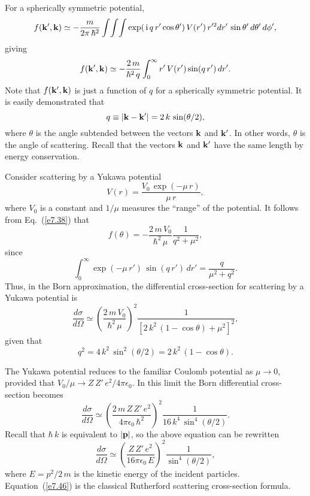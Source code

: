 For a spherically symmetric potential, 
\begin{equation}
f({\bf k}', {\bf k}) \simeq  - \frac{m}{2\pi\, \hbar^2} \int\!\int\!\int
\exp(\,{\rm i} \, q \,r'\cos\theta') \, V(r')\,r'^2 dr'\,\sin\theta'
 \,d\theta'\,d\phi',
\end{equation}
giving
\begin{equation}\label{e7.38}
f({\bf k}', {\bf k}) \simeq  - \frac{2\,m}{\hbar^2\,q}
\int_0^\infty r' \,V(r') \sin(q \,r') \,dr'.
\end{equation}
Note that $f({\bf k}', {\bf k})$ is just a function of $q$ for a
spherically symmetric potential.
It is easily demonstrated that
\begin{equation}
q \equiv |{\bf k} - {\bf k}'| = 2\, k \,\sin (\theta/2),
\end{equation}
where $\theta$ is the angle subtended between the vectors
${\bf k}$ and ${\bf k}'$. In other words, $\theta$ is the angle of
scattering. Recall that the
vectors ${\bf k}$ and ${\bf k}'$ have the same length by energy conservation.

Consider scattering by a Yukawa potential
\begin{equation}
V(r) = \frac{V_0\,\exp(-\mu \,r)}{\mu \,r},
\end{equation}
where $V_0$ is a constant and $1/\mu$ measures the ``range'' of the
potential. It follows from Eq.~(\ref{e7.38}) that
\begin{equation}
f(\theta) = - \frac{2\,m \,V_0}{\hbar^2\,\mu} \frac{1}{q^2 + \mu^2},
\end{equation}
since
\begin{equation}
\int_0^\infty \exp(-\mu \,r') \,\sin(q\,r') \, dr' = \frac{q}{\mu^2 + q^2}.
\end{equation}
Thus, in the Born approximation, the differential cross-section
for scattering by a Yukawa potential is
\begin{equation}
\frac{d\sigma}{d \Omega} \simeq \left(\frac{2\,m \,V_0}{ \hbar^2\,\mu}\right)^2
\frac{1}{[2\,k^2\, (1-\cos\theta) + \mu^2]^2},
\end{equation}
given that
\begin{equation}
q^2 = 4\,k^2\, \sin^2(\theta/2) = 2\,k^2\, (1-\cos\theta).
\end{equation}

The Yukawa potential reduces to the familiar Coulomb potential as
$\mu \rightarrow 0$, provided that $V_0/\mu \rightarrow
Z\,Z'\, e^2 / 4\pi\epsilon_0$. In this limit the Born differential cross-section becomes
\begin{equation}
\frac{d\sigma}{d\Omega} \simeq \left(\frac{2\,m \,Z\, Z'\, e^2}{4\pi\epsilon_0\,\hbar^2}\right)^2
\frac{1}{ 16 \,k^4\, \sin^4( \theta/2)}.
\end{equation}
Recall that $\hbar\, k$ is equivalent to $|{\bf p}|$, so the above
equation can be rewritten 
\begin{equation}\label{e7.46}
 \frac{d\sigma}{d\Omega} \simeq\left(\frac{Z \,Z'\, e^2}{16\pi\epsilon_0\,E}\right)^2
\frac{1}{\sin^4(\theta/2)},
\end{equation}
where $E= p^2/2\,m$ is the kinetic energy of the incident particles. 
Equation~(\ref{e7.46}) is the classical Rutherford scattering cross-section formula.

